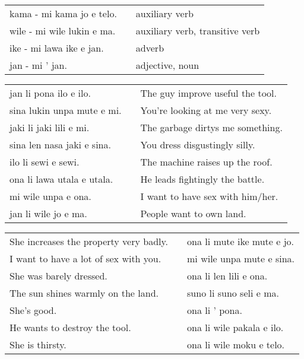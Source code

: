 \begin{supertabular}{p{5,5cm}|ll}
    kama - mi kama jo e telo.  &  & auxiliary verb                  \\ %
    wile - mi wile lukin e ma. &  & auxiliary verb, transitive verb \\ %
    ike - mi lawa ike e jan.   &  & adverb                          \\ %
    jan - mi ' jan.            &  & adjective, noun                 \\ %
\end{supertabular}

\begin{supertabular}{p{5,5cm}|ll}
    jan li pona ilo e ilo.     &  & The guy improve useful the tool. \\
    sina lukin unpa mute e mi. &  & You're looking at me very sexy.  \\
    jaki li jaki lili e mi.    &  & The garbage dirtys me something. \\
    sina len nasa jaki e sina. &  & You dress disgustingly silly.    \\
    ilo li sewi e sewi.        &  & The machine raises up the roof.  \\
    ona li lawa utala e utala. &  & He leads fightingly the battle.  \\
    mi wile unpa e ona.        &  & I want to have sex with him/her. \\
    jan li wile jo e ma.       &  & People want to own land.         \\
\end{supertabular}

\begin{supertabular}{p{5,5cm}|ll}
    She increases the property very badly. &  & ona li mute ike mute e jo. \\ %
    I want to have a lot of sex with you.  &  & mi wile unpa mute e sina.  \\ %
    She was barely dressed.                &  & ona li len lili e ona.     \\ %
    The sun shines warmly on the land.     &  & suno li suno seli e ma.    \\ %
    She's good.                            &  & ona li ' pona.             \\ %
    He wants to destroy the tool.          &  & ona li wile pakala e ilo.  \\ %
    She is thirsty.                        &  & ona li wile moku e telo.   \\ %
\end{supertabular}

